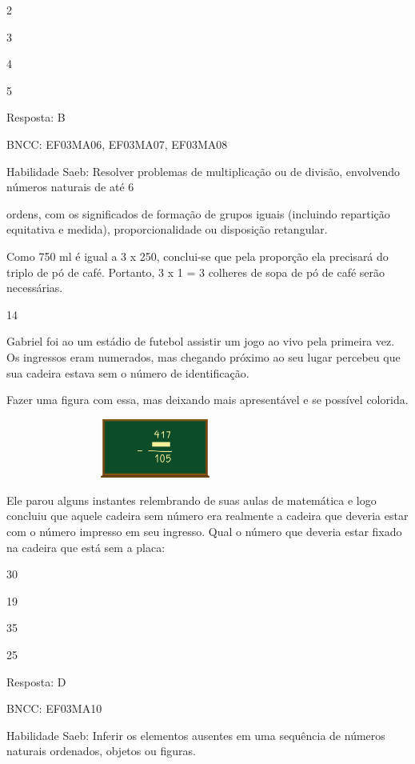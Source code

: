 \begin{escolha}
\begin{escolha}
\item
  2
\item
  3
\item
  4
\item
  5
\end{escolha}

Resposta: B

BNCC: EF03MA06, EF03MA07, EF03MA08

Habilidade Saeb: Resolver problemas de multiplicação ou de divisão,
envolvendo números naturais de até 6

ordens, com os significados de formação de grupos iguais (incluindo
repartição equitativa e medida), proporcionalidade ou disposição
retangular.

Como 750 ml é igual a 3 x 250, conclui-se que pela proporção ela
precisará do triplo de pó de café. Portanto, 3 x 1 = 3 colheres de sopa
de pó de café serão necessárias.

\num{14}

Gabriel foi ao um estádio de futebol assistir um jogo ao vivo pela
primeira vez. Os ingressos eram numerados, mas chegando próximo ao seu
lugar percebeu que sua cadeira estava sem o número de identificação.

Fazer uma figura com essa, mas deixando mais apresentável e se possível
colorida.

\includegraphics[width=3.87534in,height=0.76673in]{media/image122.png}

Ele parou alguns instantes relembrando de suas aulas de matemática e
logo concluiu que aquele cadeira sem número era realmente a cadeira que
deveria estar com o número impresso em seu ingresso. Qual o número que
deveria estar fixado na cadeira que está sem a placa:

\begin{escolha}
\item
  30
\item
  19
\item
  35
\item
  25
\end{escolha}

Resposta: D

BNCC: EF03MA10

Habilidade Saeb: Inferir os elementos ausentes em uma sequência de
números naturais ordenados, objetos ou figuras.


\end{escolha}
